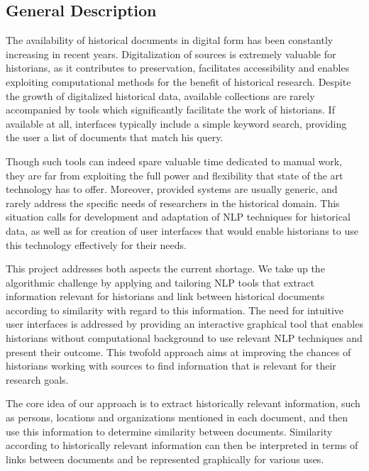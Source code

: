 \subsection{General Description}
\label{sec:general_description}
The availability of historical documents in digital form has been constantly increasing in recent years. 
Digitalization of sources is extremely valuable for historians, as it contributes to preservation, facilitates 
accessibility and enables exploiting computational methods for the benefit of historical research. Despite the growth 
of digitalized historical data, available collections are rarely accompanied by tools which significantly facilitate the 
work of historians. If available at all,  interfaces typically include a simple keyword search, providing the user a list 
of documents that match his query. 

Though such tools can indeed spare valuable time dedicated to manual work, 
they are far from exploiting the full power and flexibility that state of the art technology has to offer. 
Moreover, provided systems are usually generic, and rarely address the specific needs of researchers in the historical domain. 
This situation calls for development and adaptation of NLP techniques for historical data, as well as for creation of user interfaces 
that would enable historians to use this technology effectively for their needs. 

This project addresses both aspects the current shortage. We take up the algorithmic challenge by applying and tailoring NLP tools 
that extract information relevant for historians and link between historical documents according to similarity with regard to this information.
The need for intuitive user interfaces is addressed by providing an interactive graphical tool that enables historians without 
computational background to use relevant NLP techniques and present their outcome. This twofold approach aims at improving the chances of 
historians working with sources to find information that is relevant for their research goals.

The core idea of our approach is to extract historically relevant information, such as persons, locations and organizations mentioned in each document,
and then use this information to determine similarity between documents. Similarity according to historically relevant information
can then be interpreted in terms of links between documents and be represented graphically for various uses.


